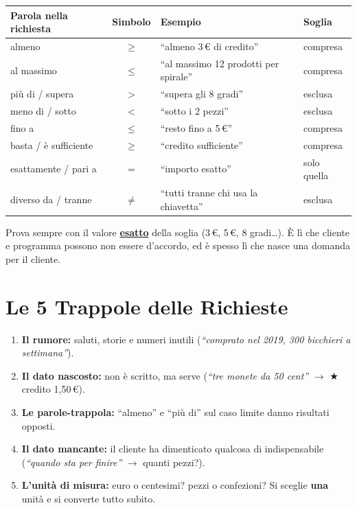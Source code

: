 \begin{center}
\renewcommand{\arraystretch}{1.4}
\begin{tabular}{|l|c|l|l|}
\hline
\rowcolor{PiazzaPrimary!15}
\textbf{Parola nella richiesta} & \textbf{Simbolo} & \textbf{Esempio} & \textbf{Soglia} \\
\hline
almeno                & $\geq$ & ``almeno 3\,\euro{} di credito''           & compresa \\
al massimo            & $\leq$ & ``al massimo 12 prodotti per spirale''   & compresa \\
più di / supera       & $>$    & ``supera gli 8 gradi''                   & esclusa \\
meno di / sotto       & $<$    & ``sotto i 2 pezzi''                      & esclusa \\
fino a                & $\leq$ & ``resto fino a 5\,\euro''                 & compresa \\
basta / è sufficiente & $\geq$ & ``credito sufficiente''                  & compresa \\
esattamente / pari a  & $=$    & ``importo esatto''                       & solo quella \\
diverso da / tranne   & $\neq$ & ``tutti tranne chi usa la chiavetta''    & esclusa \\
\hline
\end{tabular}
\end{center}

\begin{attenzione}
Prova sempre con il valore \textbf{\underline{esatto}} della soglia (3\,\euro, 5\,\euro, 8 gradi\dots). È lì che cliente e programma possono non essere d'accordo, ed è spesso lì che nasce una domanda per il cliente.
\end{attenzione}

\section{Le 5 Trappole delle Richieste}

\begin{enumerate}
  \item \textbf{Il rumore:} saluti, storie e numeri inutili (\emph{``comprato nel 2019, 300 bicchieri a settimana''}).
  \item \textbf{Il dato nascosto:} non è scritto, ma serve (\emph{``tre monete da 50 cent''} $\to$ $\bigstar$ credito 1,50\,\euro).
  \item \textbf{Le parole-trappola:} ``almeno'' e ``più di'' sul caso limite danno risultati opposti.
  \item \textbf{Il dato mancante:} il cliente ha dimenticato qualcosa di indispensabile (\emph{``quando sta per finire''} $\to$ quanti pezzi?).
  \item \textbf{L'unità di misura:} euro o centesimi? pezzi o confezioni? Si sceglie \textbf{una} unità e si converte tutto subito.
\end{enumerate}


